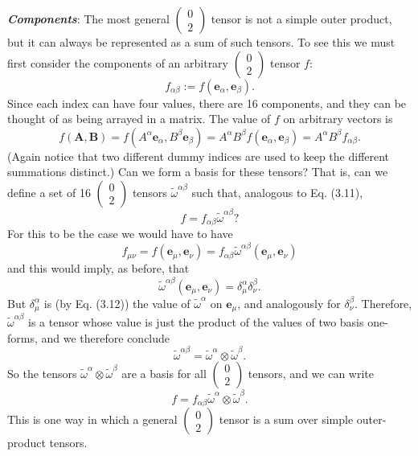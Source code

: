 \documentclass[12pt]{book}
\begin{document}
    \textit{\textbf{Components}}: The most general \(\left(\begin{array}{c} 0 \\ 2 \end{array}\right)\) tensor is not a simple outer product, but it can always be represented as a sum of such tensors. To see this we must first consider the components of an arbitrary \(\left(\begin{array}{c} 0 \\ 2 \end{array}\right)\) tensor \(f\):
    \[
    f_{\alpha\beta} := f(\mathbf{e}_\alpha, \mathbf{e}_\beta). \tag{3.21}
    \]
    Since each index can have four values, there are 16 components, and they can be thought of as being arrayed in a matrix. The value of \(f\) on arbitrary vectors is
    \[
    f(\mathbf{A},\mathbf{B}) = f(A^\alpha \mathbf{e}_\alpha, B^\beta \mathbf{e}_\beta)
    = A^\alpha B^\beta f(\mathbf{e}_\alpha, \mathbf{e}_\beta)
    = A^\alpha B^\beta f_{\alpha\beta}. \tag{3.22}
    \]
    (Again notice that two different dummy indices are used to keep the different summations distinct.) Can we form a basis for these tensors? That is, can we define a set of 16 \(\left(\begin{array}{c} 0 \\ 2 \end{array}\right)\) tensors \(\tilde{\omega}^{\alpha\beta}\) such that, analogous to Eq. (3.11),
    \[
    f = f_{\alpha\beta} \tilde{\omega}^{\alpha\beta}? \tag{3.23}
    \]
    For this to be the case we would have to have
    \[
    f_{\mu\nu} = f(\mathbf{e}_\mu, \mathbf{e}_\nu) = f_{\alpha\beta} \tilde{\omega}^{\alpha\beta}(\mathbf{e}_\mu, \mathbf{e}_\nu)
    \]
    and this would imply, as before, that
    \[
    \tilde{\omega}^{\alpha\beta}(\mathbf{e}_\mu, \mathbf{e}_\nu) = \delta^\alpha_\mu \delta^\beta_\nu. \tag{3.24}
    \]
    But \(\delta^\alpha_\mu\) is (by Eq. (3.12)) the value of \(\tilde{\omega}^\alpha\) on \(\mathbf{e}_\mu\), and analogously for \(\delta^\beta_\nu\). Therefore, \(\tilde{\omega}^{\alpha\beta}\) is a tensor whose value is just the product of the values of two basis one-forms, and we therefore conclude
    \[
    \tilde{\omega}^{\alpha\beta} = \tilde{\omega}^\alpha \otimes \tilde{\omega}^\beta. \tag{3.25}
    \]
    So the tensors \(\tilde{\omega}^\alpha \otimes \tilde{\omega}^\beta\) are a basis for all \(\left(\begin{array}{c} 0 \\ 2 \end{array}\right)\) tensors, and we can write
    \[
    f = f_{\alpha\beta} \tilde{\omega}^\alpha \otimes \tilde{\omega}^\beta. \tag{3.26}
    \]
    This is one way in which a general \(\left(\begin{array}{c} 0 \\ 2 \end{array}\right)\) tensor is a sum over simple outer-product tensors.
    
\end{document}
